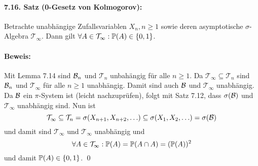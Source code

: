 \documentclass[12pt]{report}
\begin{document}
\paragraph{7.16. Satz (0-Gesetz von Kolmogorov):}Betrachte unabh\"angige Zufallsvariablen $X_n,n\geq1$ sowie deren asymptotische $\sigma$-Algebra $\mathcal{T}_\infty$. Dann gilt $\forall A\in\mathcal{T}_\infty:\mathbb{P}(A)\in\{0,1\}$.

\paragraph{Beweis:}Mit Lemma 7.14 sind $\mathcal{B}_n$ und $\mathcal{T}_n$ unbah\"angig f\"ur alle $n\geq1$. Da $\mathcal{T}_\infty\subseteq\mathcal{T}_n$ sind $\mathcal{B}_n$ und $\mathcal{T}_\infty$ f\"ur alle $n\geq1$ unabh\"angig. Damit sind auch $\mathcal{B}$ und $\mathcal{T}_\infty$ unabh\"angig. Da $\mathcal{B}$ ein $\pi$-System ist (leicht nachzupr\"ufen), folgt mit Satz 7.12, dass $\sigma(\mathcal{B})$ und $\mathcal{T}_\infty$ unabh\"angig sind. Nun ist
$$\mathcal{T}_\infty\subseteq\mathcal{T}_n=\sigma(X_{n+1},X_{n+2},\hdots)\subseteq\sigma(X_1,X_2,\hdots)=\sigma(\mathcal{B})$$
und damit sind $\mathcal{T}_\infty$ und $\mathcal{T}_\infty$ unabh\"angig und 
$$\forall A\in\mathcal{T}_\infty:\mathbb{P}(A)=\mathbb{P}(A\cap A)=(\mathbb{P}(A))^2$$
und damit $\mathbb{P}(A)\in\{0,1\}$. \qed
\end{document}
